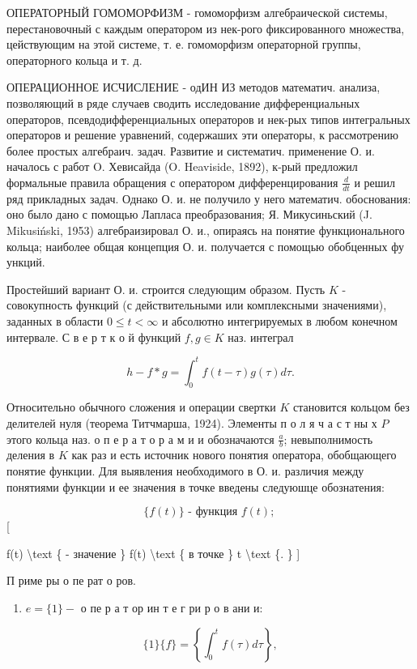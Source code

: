 \documentclass[10pt]{article}
\begin{document}
ОПЕРАТОРНЫЙ ГОМОМОРФИЗМ - гомоморфизм алгебраической системы, перестановочный с каждым оператором из нек-рого фиксированного множества, цействующим на этой системе, т. е. гомоморфизм операторной группы, операторного кольца и т. д.

ОПЕРАЦИОННОЕ ИСЧИСЛЕНИЕ - одИН ИЗ методов математич. анализа, позволяющий в ряде случаев сводить исследование дифференциальных операторов, псевдодифференциальных операторов и нек-рых типов интегральных операторов и решение уравнений, содержаших эти операторы, к рассмотрению более простых алгебраич. задач. Развитие и систематич. применение О. и. началось с работ O. Хевисайда (O. Heaviside, 1892), к-рый предложил формальные правила обращения с оператором дифференцирования $\frac{d}{d t}$ и решил ряд прикладных задач. Однако О. и. не получило у него математич. обоснования: оно было дано с помощью Лапласа преобразования; Я. Микусиньский (J. Mikusiński, 1953) алгебраизировал О. и., опираясь на понятие функционального кольца; наиболее общая концепция О. и. получается с помощью обобценных фу ункций.

Простейший вариант О. и. строится следующим образом. Пусть $K$ - совокупность функций (с действительными или комплексными значениями), заданных в области $0 \leqslant t<\infty$ и абсолютно интегрируемых в любом конечном интервале. С в е р т к о й функций $f, g \in K$ наз. интеграл

\[
h-f * g=\int_{0}^{t} f(t-\tau) g(\tau) d \tau .
\]

Относительно обычного сложения и операции свертки $K$ становится кольцом без делителей нуля (теорема Титчмарша, 1924). Элементы п о л я ч а с т ны х $P$ этого кольца наз. о п е р а т о р а м и и обозначаются $\frac{a}{b}$; невыполнимость деления в $K$ как раз и есть источник нового понятия оператора, обобщающего понятие функции. Для выявления необходимого в О. и. различия между понятиями функции и ее значения в точке введены следуюшце обознатения:

\[
\{f(t)\} \text { - функция } f(t) \text {; }
\][

f(t) \textbackslash text \{ - значение \} f(t) \textbackslash text \{ в точке \} t \textbackslash text \{. \}
]

П риме ры о пе рат о ров.

\begin{enumerate}
  \item $e=\{1\}-$ о пе р а т ор ин т е г ри р о в ани и:
\end{enumerate}

\[
\{1\}\{f\}=\left\{\int_{0}^{t} f(\tau) d \tau\right\},
\]
\end{document}
